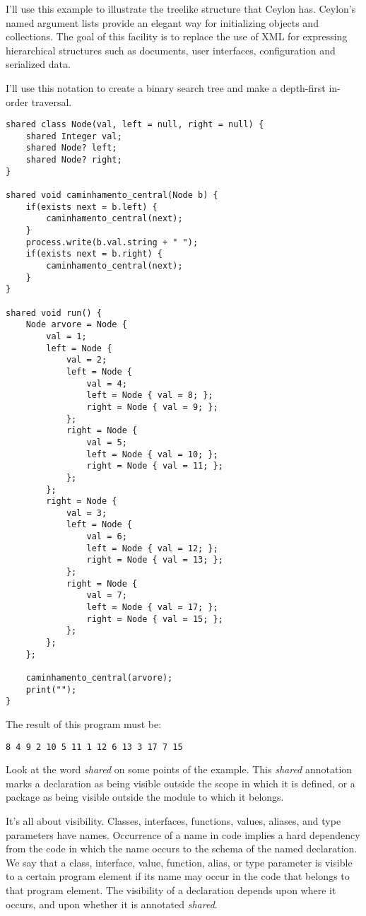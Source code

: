 I'll use this example to illustrate the treelike structure that Ceylon has.
Ceylon's named argument lists provide an elegant way for initializing objects
and collections. The goal of this facility is to replace the use of XML for
expressing hierarchical structures such as documents, user interfaces,
configuration and serialized data.

I'll use this notation to create a binary search tree and make a depth-first
in-order traversal.

\begin{lstlisting}[label=ctls,caption=Ceylon treelike structure]
shared class Node(val, left = null, right = null) {
	shared Integer val;
	shared Node? left;
	shared Node? right;
}

shared void caminhamento_central(Node b) {
	if(exists next = b.left) {
		caminhamento_central(next);
	}
	process.write(b.val.string + " ");
	if(exists next = b.right) {
		caminhamento_central(next);
	}
}

shared void run() {
	Node arvore = Node {
		val = 1;
		left = Node {
			val = 2;
			left = Node {
				val = 4;
				left = Node { val = 8; };
				right = Node { val = 9; };
			};
			right = Node {
				val = 5;
				left = Node { val = 10; };
				right = Node { val = 11; };
			};
		};
		right = Node {
			val = 3;
			left = Node {
				val = 6;
				left = Node { val = 12; };
				right = Node { val = 13; };
			};
			right = Node {
				val = 7;
				left = Node { val = 17; };
				right = Node { val = 15; };
			};
		};
	};

	caminhamento_central(arvore);
	print("");
}
\end{lstlisting}

The result of this program must be:

\begin{verbatim}
8 4 9 2 10 5 11 1 12 6 13 3 17 7 15
\end{verbatim}


Look at the word \textit{shared} on some points of the example. This \textit{shared}
annotation marks a declaration as being visible outside the scope in which it is
defined, or a package as being visible outside the module to which it
belongs\cite{1_6}.

It's all about visibility\cite{1_7}. Classes, interfaces, functions, values,
aliases, and type parameters have names. Occurrence of a name in code implies a
hard dependency from the code in which the name occurs to the schema of the
named declaration. We say that a class, interface, value, function, alias, or
type parameter is visible to a certain program element if its name may occur in
the  code that belongs to that program element. The visibility of a declaration
depends upon where it occurs, and upon whether it is annotated \textit{shared}.

